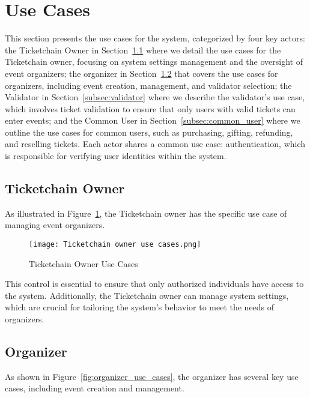 \section{Use Cases}
\label{sec:use_cases}

This section presents the use cases for the system, categorized by four key
actors: the Ticketchain Owner in Section~\ref{subsec:ticketchain_owner} where
we detail the use cases for the Ticketchain owner, focusing on system settings
management and the oversight of event organizers; the organizer in
Section~\ref{subsec:organizer} that covers the use cases for organizers,
including event creation, management, and validator selection; the Validator in
Section~\ref{subsec:validator} where we describe the validator's use case,
which involves ticket validation to ensure that only users with valid tickets
can enter events; and the Common User in Section~\ref{subsec:common_user} where
we outline the use cases for common users, such as purchasing, gifting,
refunding, and reselling tickets. Each actor shares a common use case:
authentication, which is responsible for verifying user identities within the
system.

\subsection{Ticketchain Owner}
\label{subsec:ticketchain_owner}

As illustrated in Figure~\ref{fig:ticketchain_owner_use_cases}, the Ticketchain
owner has the specific use case of managing event organizers.

\begin{figure}[H]
    \centering
    \texttt{[image: Ticketchain owner use cases.png]}
    \caption{Ticketchain Owner Use Cases}
    \label{fig:ticketchain_owner_use_cases}
\end{figure}

This control is essential to ensure that only authorized individuals have
access to the system. Additionally, the Ticketchain owner can manage system
settings, which are crucial for tailoring the system’s behavior to meet the
needs of organizers.

\subsection{Organizer}
\label{subsec:organizer}

As shown in Figure~\ref{fig:organizer_use_cases}, the organizer has several key
use cases, including event creation and management.

